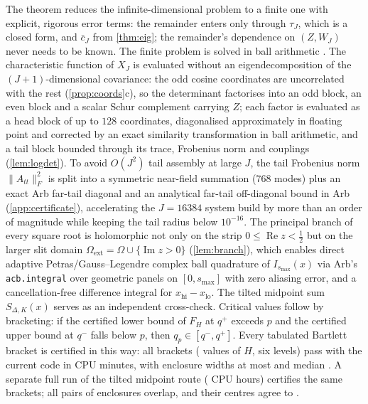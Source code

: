 The theorem reduces the infinite-dimensional problem to a finite one with explicit, rigorous error terms: the
remainder enters only through $\tau_J$, which is a closed form, and $\bar c_J$ from \cref{thm:eig}; the remainder's
dependence on $(Z,W_J)$ never needs to be known. The finite problem is solved in ball arithmetic \citep{Joh17}.
The characteristic function of $X_J$ is evaluated without an eigendecomposition of the $(J+1)$-dimensional covariance:
the odd cosine coordinates are uncorrelated with the rest (\cref{prop:coords}c), so the determinant factorises into an
odd block, an even block and a scalar Schur complement carrying $Z$; each factor is evaluated as a head block of up to
$128$ coordinates, diagonalised approximately in floating point and corrected by an exact similarity transformation in
ball arithmetic, and a tail block bounded through its trace, Frobenius norm and couplings (\cref{lem:logdet}). To avoid
$O(J^2)$ tail assembly at large $J$, the tail Frobenius norm $\|A_{tt}\|_F^2$ is split into a symmetric near-field
summation ($768$ modes) plus an exact Arb far-tail diagonal and an analytical far-tail off-diagonal bound in Arb
(\cref{app:certificate}), accelerating the $J=16384$ system build by more than an order of magnitude while keeping the
tail radius below $10^{-16}$. The principal branch of every square root is holomorphic not only on the strip
$0\le\operatorname{Re}z<\frac12$ but on the larger slit domain $\Omega_{\mathrm{ext}}=\Omega\cup\{\operatorname{Im}z>0\}$
(\cref{lem:branch}), which enables direct adaptive Petras/Gauss--Legendre complex ball quadrature of $I_{s_{\max}}(x)$
via Arb's \texttt{acb.integral} \citep{Joh18} over geometric panels on $[0,s_{\max}]$ with zero aliasing error, and a
cancellation-free difference integral for $x_{\mathrm{hi}}-x_{\mathrm{lo}}$. The tilted midpoint sum $S_{\Delta,K}(x)$
serves as an independent cross-check. Critical values follow by bracketing: if the certified lower bound of $F_H$ at
$q^+$ exceeds $p$ and the certified upper bound at $q^-$ falls below $p$, then $q_p\in[q^-,q^+]$. Every tabulated
Bartlett bracket is certified in this way: all  brackets ( values of $H$, six
levels) pass with the current code in  CPU minutes, with enclosure widths at most
 and median . A separate full run of the tilted midpoint route
( CPU hours) certifies the same brackets; all  pairs of enclosures overlap, and their
centres agree to .

